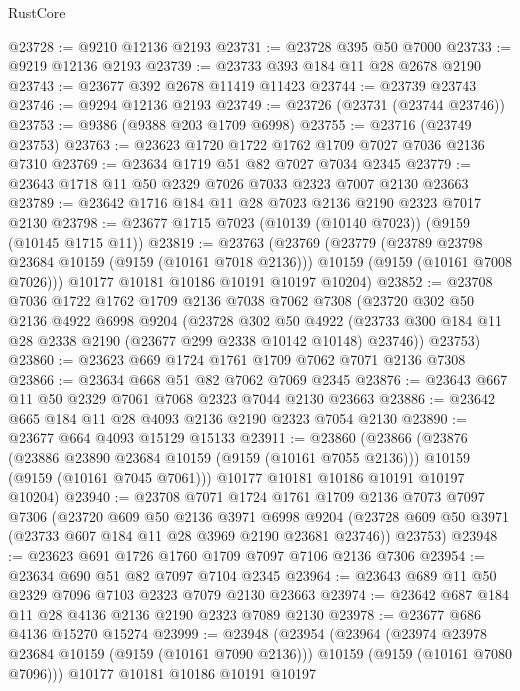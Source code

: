 \begin{lexlean}{RustCore}
\begin{coremodule}
@23728 := @9210 @12136 @2193
@23731 := @23728 @395 @50 @7000
@23733 := @9219 @12136 @2193
@23739 := @23733 @393 @184 @11 @28 @2678 @2190
@23743 := @23677 @392 @2678 @11419 @11423
@23744 := @23739 @23743
@23746 := @9294 @12136 @2193
@23749 := @23726 (@23731 (@23744 @23746))
@23753 := @9386 (@9388 @203 @1709 @6998)
@23755 := @23716 (@23749 @23753)
@23763 := @23623 @1720 @1722 @1762 @1709 @7027 @7036 @2136 @7310
@23769 := @23634 @1719 @51 @82 @7027 @7034 @2345
@23779 := @23643 @1718 @11 @50 @2329 @7026 @7033 @2323 @7007 @2130 @23663
@23789 := @23642 @1716 @184 @11 @28 @7023 @2136 @2190 @2323 @7017 @2130
@23798 := @23677 @1715 @7023 (@10139 (@10140 @7023)) (@9159 (@10145 @1715 @11))
@23819 := @23763
    (@23769
      (@23779
        (@23789 @23798 @23684 @10159 (@9159 (@10161 @7018 @2136)))
        @10159
        (@9159 (@10161 @7008 @7026)))
      @10177
      @10181
      @10186
      @10191
      @10197
      @10204)
@23852 := @23708
    @7036
    @1722
    @1762
    @1709
    @2136
    @7038
    @7062
    @7308
    (@23720
      @302
      @50
      @2136
      @4922
      @6998
      @9204
      (@23728
        @302
        @50
        @4922
        (@23733 @300 @184 @11 @28 @2338 @2190 (@23677 @299 @2338 @10142 @10148) @23746))
      @23753)
@23860 := @23623 @669 @1724 @1761 @1709 @7062 @7071 @2136 @7308
@23866 := @23634 @668 @51 @82 @7062 @7069 @2345
@23876 := @23643 @667 @11 @50 @2329 @7061 @7068 @2323 @7044 @2130 @23663
@23886 := @23642 @665 @184 @11 @28 @4093 @2136 @2190 @2323 @7054 @2130
@23890 := @23677 @664 @4093 @15129 @15133
@23911 := @23860
    (@23866
      (@23876
        (@23886 @23890 @23684 @10159 (@9159 (@10161 @7055 @2136)))
        @10159
        (@9159 (@10161 @7045 @7061)))
      @10177
      @10181
      @10186
      @10191
      @10197
      @10204)
@23940 := @23708
    @7071
    @1724
    @1761
    @1709
    @2136
    @7073
    @7097
    @7306
    (@23720
      @609
      @50
      @2136
      @3971
      @6998
      @9204
      (@23728 @609 @50 @3971 (@23733 @607 @184 @11 @28 @3969 @2190 @23681 @23746))
      @23753)
@23948 := @23623 @691 @1726 @1760 @1709 @7097 @7106 @2136 @7306
@23954 := @23634 @690 @51 @82 @7097 @7104 @2345
@23964 := @23643 @689 @11 @50 @2329 @7096 @7103 @2323 @7079 @2130 @23663
@23974 := @23642 @687 @184 @11 @28 @4136 @2136 @2190 @2323 @7089 @2130
@23978 := @23677 @686 @4136 @15270 @15274
@23999 := @23948
    (@23954
      (@23964
        (@23974 @23978 @23684 @10159 (@9159 (@10161 @7090 @2136)))
        @10159
        (@9159 (@10161 @7080 @7096)))
      @10177
      @10181
      @10186
      @10191
      @10197

\end{coremodule}
\end{lexlean}
